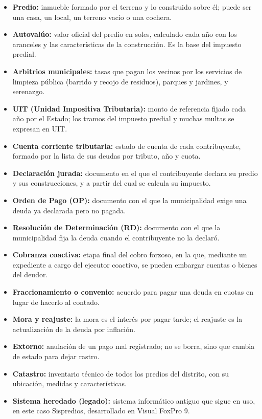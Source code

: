 \documentclass[12pt,a4paper]{report}
\begin{document}
\begin{itemize}[leftmargin=1.25cm,itemsep=0pt,topsep=0pt]
  \item \textbf{Predio:} inmueble formado por el terreno y lo construido sobre él; puede ser una casa, un local, un terreno vacío o una cochera.
  \item \textbf{Autovalúo:} valor oficial del predio en soles, calculado cada año con los aranceles y las características de la construcción. Es la base del impuesto predial.
  \item \textbf{Arbitrios municipales:} tasas que pagan los vecinos por los servicios de limpieza pública (barrido y recojo de residuos), parques y jardines, y serenazgo.
  \item \textbf{UIT (Unidad Impositiva Tributaria):} monto de referencia fijado cada año por el Estado; los tramos del impuesto predial y muchas multas se expresan en UIT.
  \item \textbf{Cuenta corriente tributaria:} estado de cuenta de cada contribuyente, formado por la lista de sus deudas por tributo, año y cuota.
  \item \textbf{Declaración jurada:} documento en el que el contribuyente declara su predio y sus construcciones, y a partir del cual se calcula su impuesto.
  \item \textbf{Orden de Pago (OP):} documento con el que la municipalidad exige una deuda ya declarada pero no pagada.
  \item \textbf{Resolución de Determinación (RD):} documento con el que la municipalidad fija la deuda cuando el contribuyente no la declaró.
  \item \textbf{Cobranza coactiva:} etapa final del cobro forzoso, en la que, mediante un expediente a cargo del ejecutor coactivo, se pueden embargar cuentas o bienes del deudor.
  \item \textbf{Fraccionamiento o convenio:} acuerdo para pagar una deuda en cuotas en lugar de hacerlo al contado.
  \item \textbf{Mora y reajuste:} la mora es el interés por pagar tarde; el reajuste es la actualización de la deuda por inflación.
  \item \textbf{Extorno:} anulación de un pago mal registrado; no se borra, sino que cambia de estado para dejar rastro.
  \item \textbf{Catastro:} inventario técnico de todos los predios del distrito, con su ubicación, medidas y características.
  \item \textbf{Sistema heredado (legado):} sistema informático antiguo que sigue en uso, en este caso Sispredios, desarrollado en Visual FoxPro 9.

\end{itemize}
\end{document}
